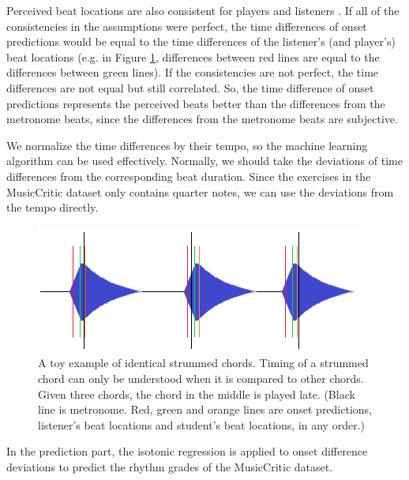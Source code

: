 Perceived beat locations are also consistent for players \cite{freire2018strumming} and listeners \cite{hove2007sensorimotor}. If all of the consistencies in the assumptions were perfect, the time differences of onset predictions would be equal to the time differences of the listener's (and player's) beat locations (e.g. in Figure \ref{fig:devi}, differences between red lines are equal to the differences between green lines). If the consistencies are not perfect, the time differences are not equal but still correlated. So, the time difference of onset predictions represents the perceived beats better than the differences from the metronome beats, since the differences from the metronome beats are subjective. 

We normalize the time differences by their tempo, so the machine learning algorithm can be used effectively. Normally, we should take the deviations of time differences from the corresponding beat duration. Since the exercises in the MusicCritic dataset only contains quarter notes, we can use the deviations from the tempo directly. 

\begin{figure}
    \centering
    \includegraphics[width=\columnwidth]{methods/devi.png}
    \caption{A toy example of identical strummed chords. Timing of a strummed chord can only be understood when it is compared to other chords. Given three chords, the chord in the middle is played late. (Black line is metronome. Red, green and orange lines are onset predictions, listener's beat locations and student's beat locations, in any order.)}
    \label{fig:devi}
\end{figure}

In the prediction part, the isotonic regression is applied to onset difference deviations to predict the rhythm grades of the MusicCritic dataset.

